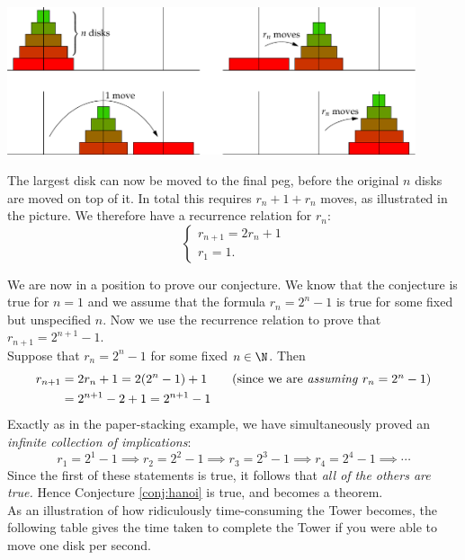 \begin{center}
\includegraphics[width=0.9\textwidth]{induction-04-hanoirn}
\end{center}

\noindent The largest disk can now be moved to the final peg, before the original $n$ disks are moved on top of it. In total this requires $r_n+1+r_n$ moves, as illustrated in the picture. We therefore have a recurrence relation for $r_n$:
\[\begin{cases}
r_{n+1}=2r_n+1\\
r_1=1.
\end{cases}\]

We are now in a position to prove our conjecture. We know that the conjecture is true for $n=1$ and we assume that the formula $r_n=2^n-1$ is true for some fixed but unspecified $n$. Now we use the recurrence relation to prove that $r_{n+1}=2^{n+1}-1$.\\

\quad Suppose that $r_n=2^n-1$ for some fixed $n\in\N$. Then
\begin{align*}
r_{n+1}&=2r_n+1=2(2^n-1)+1\tag*{(since we are \emph{assuming} $r_n=2^n-1$)}\\
&=2^{n+1}-2+1=2^{n+1}-1
\end{align*}
Exactly as in the paper-stacking example, we have simultaneously proved an \emph{infinite collection of implications}:
\[r_1=2^1-1\implies r_2=2^2-1\implies r_3=2^3-1\implies r_4=2^4-1\implies \cdots\]
Since the first of these statements is true, it follows that \emph{all of the others are true.} Hence Conjecture \ref{conj:hanoi} is true, and becomes a theorem.\\

As an illustration of how ridiculously time-consuming the Tower becomes, the following table gives the time taken to complete the Tower if you were able to move one disk per second.


